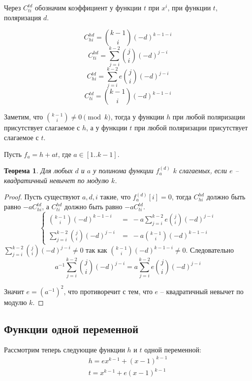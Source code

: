 \documentclass[bibliography=totoc, a4paper, 12pt]{extarticle}
\newtheorem{myth}{Теорема}
\begin{document}
Через $C^{td}_{ti}$ обозначим коэффициент у функции $t$ при $x^i$, при
функции $t$, поляризация $d$.

\[ C^{hd}_{hi} = \binom{k-1}{i}(-d)^{k-1-i} \]
\[ C^{hd}_{ti} = \sum_{j=i}^{k-2} \binom{j}{i}(-d)^{j-i} \]
\[ C^{td}_{hi} = \sum_{j=i}^{k-2} e \binom{j}{i}(-d)^{j-i} \]
\[ C^{td}_{ti} = \binom{k-1}{i}(-d)^{k-1-i} \]

Заметим, что $\binom{k-1}{i} \neq 0 \pmod k$, тогда у функции $h$ при любой
поляризации присутствует слагаемое с $h$, а у функции $t$ при любой поляризации
присутствует слагаемое с $t$.

Пусть $f_a = h + at$, где $a \in [1 .. k-1]$.

\begin{myth}
    Для любых $d$ и $a$ у полинома функции $f^{(d)}_a$ $k$ слагаемых, если $e$
    -- квадратичный невычет по модулю $k$.
\end{myth}
\begin{proof}
    Пусть существуют $a, d, i$ такие, что $f^{(d)}_a[i] = 0$, тогда
    $C^{hd}_{hi}$ должно быть равно $-a C^{td}_{hi}$, а $C^{hd}_{ti}$ должно
    быть равно $-a C^{td}_{ti}$.
    \begin{equation*}
        \begin{cases}
            \binom{k-1}{i}(-d)^{k-1-i} & = \;
                -a \sum\limits_{j=i}^{k-2} e \binom{j}{i} (-d)^{j-i} \\
            \sum\limits_{j=i}^{k-2} \binom{j}{i} (-d)^{j-i} & = \;
                -a \binom{k-1}{i}(-d)^{k-1-i}
        \end{cases}
    \end{equation*}
    $\sum\limits_{j=i}^{k-2} \binom{j}{i} (-d)^{j-i} \neq 0$ так как
    $\binom{k-1}{i}(-d)^{k-1-i} \neq 0$.
    Следовательно
    \[
        a^{-1} \sum_{j=i}^{k-2} \binom{j}{i} (-d)^{j-i} =
            a \sum_{j=i}^{k-2} e \binom{j}{i} (-d)^{j-i}
    \]

    Значит $e = (a^{-1})^2$, что противоречит с тем, что $e$ -- квадратичный
    невычет по модулю $k$.
\end{proof}

\subsection{Функции одной переменной}
Рассмотрим теперь следующие функции $h$ и $t$ одной переменной:
\[
    \begin{array}{l}
        h = ex^{k-1} + (x-1)^{k-1} \\
        t = x^{k-1} + e(x-1)^{k-1}
    \end{array}
\]
\end{document}
